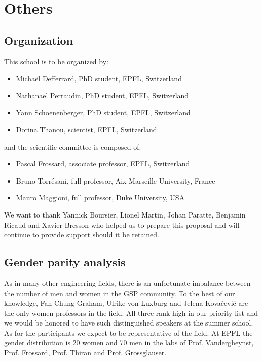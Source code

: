 \documentclass[a4paper]{scrartcl}
\begin{document}
\section{Others}

\subsection{Organization}

This school is to be organized by:
\begin{itemize}
	\setlength{\itemsep}{0pt} \setlength{\parskip}{0pt}
	\item Michaël Defferrard, PhD student, EPFL, Switzerland
	\item Nathanaël Perraudin, PhD student, EPFL, Switzerland
	\item Yann Schoenenberger, PhD student, EPFL, Switzerland
	\item Dorina Thanou, scientist, EPFL, Switzerland
\end{itemize}
and the scientific committee is composed of:
\begin{itemize}
	\setlength{\itemsep}{0pt} \setlength{\parskip}{0pt}
	\item Pascal Frossard, associate professor, EPFL, Switzerland
	\item Bruno Torrésani, full professor, Aix-Marseille University, France
	\item Mauro Maggioni, full professor, Duke University, USA
\end{itemize}

We want to thank Yannick Boursier, Lionel Martin, Johan Paratte, Benjamin Ricaud
and Xavier Bresson who helped us to prepare this proposal and will continue to
provide support should it be retained.

\subsection{Gender parity analysis}

As in many  other engineering fields, there is an unfortunate imbalance between the number of men and women in the GSP community. To the best of our knowledge, Fan Chung Graham, Ulrike von Luxburg and Jelena Kovačević are the only women professors in the field. All three rank high in our priority list and we would be honored to have such distinguished speakers at the summer school. As for the participants we expect to be representative of the field. At EPFL the gender distribution is 20 women and 70 men in the labs of Prof. Vandergheynst, Prof. Frossard, Prof. Thiran and Prof. Grossglauser.
\end{document}
